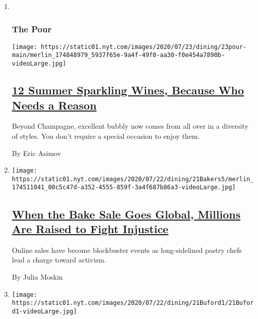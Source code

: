 \begin{enumerate}
\def\labelenumi{\arabic{enumi}.}
\item ~
  \hypertarget{the-pour}{%
  \subsubsection{The Pour}\label{the-pour}}

  \texttt{[image: https://static01.nyt.com/images/2020/07/23/dining/23pour-main/merlin\_174848979\_5937f65e-9a4f-49f0-aa30-f0e454a7890b-videoLarge.jpg]}

  \hypertarget{12-summer-sparkling-wines-because-who-needs-a-reason}{%
  \subsection{\texorpdfstring{\href{/2020/07/23/dining/drinks/best-sparkling-wines.html}{12
  Summer Sparkling Wines, Because Who Needs a
  Reason}}{12 Summer Sparkling Wines, Because Who Needs a Reason}}\label{12-summer-sparkling-wines-because-who-needs-a-reason}}

  Beyond Champagne, excellent bubbly now comes from all over in a
  diversity of styles. You don't require a special occasion to enjoy
  them.

  By Eric Asimov
\item
  \texttt{[image: https://static01.nyt.com/images/2020/07/22/dining/21Bakers5/merlin\_174511041\_00c5c47d-a352-4555-859f-3a4f687b86a3-videoLarge.jpg]}

  \hypertarget{when-the-bake-sale-goes-global-millions-are-raised-to-fight-injustice}{%
  \subsection{\texorpdfstring{\href{/2020/07/21/dining/bake-sale-activism-racism.html}{When
  the Bake Sale Goes Global, Millions Are Raised to Fight
  Injustice}}{When the Bake Sale Goes Global, Millions Are Raised to Fight Injustice}}\label{when-the-bake-sale-goes-global-millions-are-raised-to-fight-injustice}}

  Online sales have become blockbuster events as long-sidelined pastry
  chefs lead a charge toward activism.

  By Julia Moskin
\item
  \texttt{[image: https://static01.nyt.com/images/2020/07/22/dining/21Buford1/21Buford1-videoLarge.jpg]}

  \hypertarget{zooming-in-on-bill-bufords-latest-obsession}{%
}
\end{enumerate}
